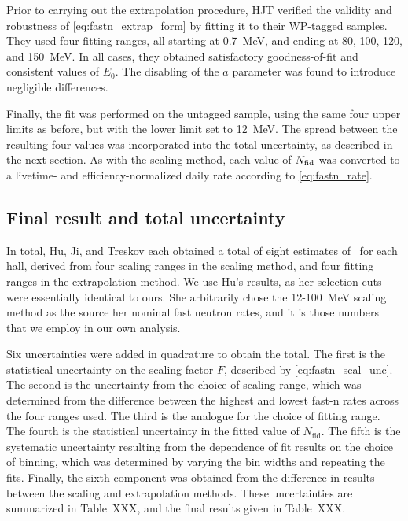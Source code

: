 \documentclass[../thesis.tex]{subfiles}
\begin{document}
Prior to carrying out the extrapolation procedure, HJT verified the validity and robustness of \eqref{eq:fastn_extrap_form} by fitting it to their WP-tagged samples. They used four fitting ranges, all starting at 0.7~MeV, and ending at 80, 100, 120, and 150~MeV. In all cases, they obtained satisfactory goodness-of-fit and consistent values of $E_0$. The disabling of the $a$ parameter was found to introduce negligible differences.

Finally, the fit was performed on the untagged sample, using the same four upper limits as before, but with the lower limit set to 12~MeV. The spread between the resulting four values was incorporated into the total uncertainty, as described in the next section. As with the scaling method, each value of $N_\mathrm{fid}$ was converted to a livetime- and efficiency-normalized daily rate according to \eqref{eq:fastn_rate}.

\subsection{Final result and total uncertainty}
\label{sec:fastn_comb}

In total, Hu, Ji, and Treskov each obtained a total of eight estimates of \rfn\ for each hall, derived from four scaling ranges in the scaling method, and four fitting ranges in the extrapolation method. We use Hu's results, as her selection cuts were essentially identical to ours. She arbitrarily chose the 12-100~MeV scaling method as the source her nominal fast neutron rates, and it is those numbers that we employ in our own analysis.

Six uncertainties were added in quadrature to obtain the total. The first is the statistical uncertainty on the scaling factor $F$, described by \eqref{eq:fastn_scal_unc}. The second is the uncertainty from the choice of scaling range, which was determined from the difference between the highest and lowest fast-n rates across the four ranges used. The third is the analogue for the choice of fitting range. The fourth is the statistical uncertainty in the fitted value of $N_\mathrm{fid}$. The fifth is the systematic uncertainty resulting from the dependence of fit results on the choice of binning, which was determined by varying the bin widths and repeating the fits. Finally, the sixth component was obtained from the difference in results between the scaling and extrapolation methods. These uncertainties are summarized in Table~XXX, and the final results given in Table~XXX.
\end{document}

